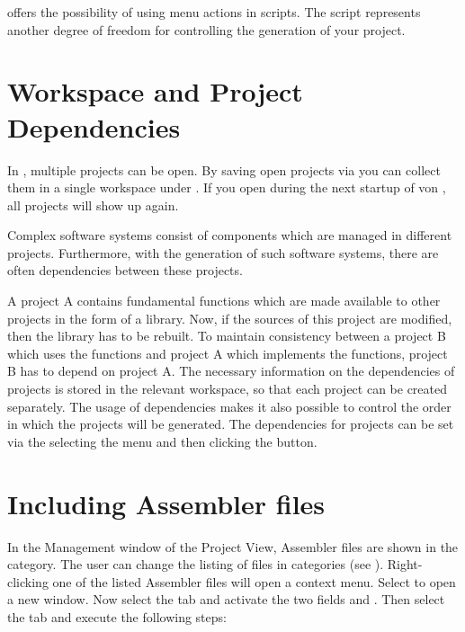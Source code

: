 \codeblocks offers the possibility of using menu actions in scripts. The script represents another degree of freedom for controlling the generation of your project.


\section{Workspace and Project Dependencies}

In \codeblocks, multiple projects can be open. By saving open projects via  you can collect them in a single workspace under . If you open  during the next startup of von \codeblocks, all projects will show up again.

Complex software systems consist of components which are managed in different \codeblocks projects. Furthermore, with the generation of such software systems, there are often dependencies between these projects.


A project A contains fundamental functions which are made available to other projects in the form of a library. Now, if the sources of this project are modified, then the library has to be rebuilt. To maintain consistency between a project B which uses the functions and project A which implements the functions, project B has to depend on project A. The necessary information on the dependencies of projects is stored in the relevant workspace, so that each project can be created separately. The usage of dependencies makes it also possible to control the order in which the projects will be generated. The dependencies for projects can be set via the selecting the menu  and then clicking the  button.

\section{Including Assembler files}

In the Management window of the Project View, Assembler files are shown in the  category. The user can change the listing of files in categories (see ). Right-clicking one of the listed Assembler files will open a context menu. Select  to open a new window. Now select the  tab and activate the two fields  and . Then select the  tab and execute the following steps:


